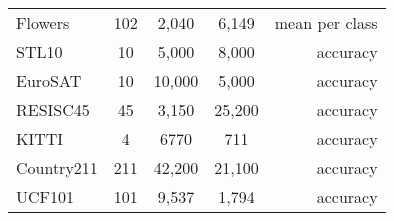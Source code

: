 \begin{table}[t]
{\begin{tabular}{lcccr}
Flowers                  & 102                             & 2,040                              & 6,149                             & mean per class                            \\
STL10                        & 10                             & 5,000                             & 8,000                            & accuracy                                  \\
EuroSAT                         & 10                              & 10,000                             & 5,000                             & accuracy                                  \\
RESISC45            & 45                              & 3,150                              & 25,200                             & accuracy                                  \\
KITTI            & 4                              & 6770                             & 711                             & accuracy                                  \\
Country211            & 211                              & 42,200                             & 21,100                             & accuracy                                  \\
UCF101            & 101                              & 9,537                             & 1,794                            & accuracy                                  \\

\end{tabular}}
\end{table}
